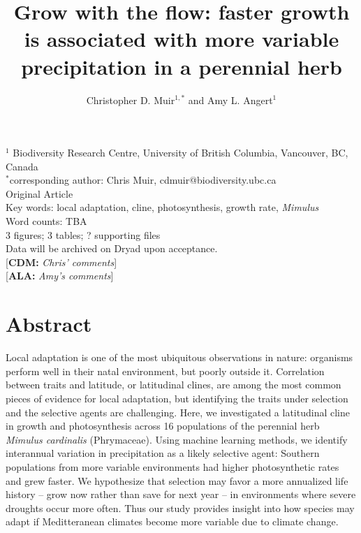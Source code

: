 \documentclass[11pt, oneside]{article}
\title{Grow with the flow: faster growth is associated with more variable precipitation in a perennial herb}
\author{Christopher D. Muir$^{1,*}$ and Amy L. Angert$^1$}
\date{}
\newcommand{\cdm}[1]{{ \color{magenta} [{\bf{CDM:}} {\em#1}]}} %
\newcommand{\ala}[1]{{ \color{blue} [{\bf{ALA:}} {\em#1}]}} %
\begin{document}

\maketitle

$^1$ Biodiversity Research Centre, University of British Columbia, Vancouver, BC, Canada \\
$^*$corresponding author: Chris Muir, cdmuir@biodiversity.ubc.ca \\

Original Article \\

Key words: local adaptation, cline, photosynthesis, growth rate, \textit{Mimulus} \\

Word counts: TBA \\
3 figures; 3 tables; ? supporting files \\
Data will be archived on Dryad upon acceptance. \\

\cdm{Chris' comments}\\
\ala{Amy's comments}

\clearpage

\listoffigures
\listoftables

\section*{Abstract}

Local adaptation is one of the most ubiquitous observations in nature: organisms perform well in their natal environment, but poorly outside it. Correlation between traits and latitude, or latitudinal clines, are among the most common pieces of evidence for local adaptation, but identifying the traits under selection and the selective agents are challenging. Here, we investigated a latitudinal cline in growth and photosynthesis across 16 populations of the perennial herb \textit{Mimulus cardinalis} (Phrymaceae). Using machine learning methods, we identify interannual variation in precipitation as a likely selective agent: Southern populations from more variable environments had higher photosynthetic rates and grew faster. We hypothesize that selection may favor a more annualized life history -- grow now rather than save for next year -- in environments where severe droughts occur more often. Thus our study provides insight into how species may adapt if Meditteranean climates become more variable due to climate change.
\end{document}
